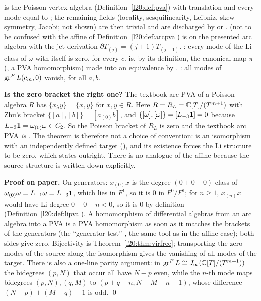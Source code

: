 \begin{dictionary}
 is the Poisson vertex algebra (Definition~\ref{l20:def:pva}) with translation  and every mode equal to
; the remaining fields (locality, sesquilinearity, Leibniz, skew-symmetry, Jacobi; not shown) are then trivial and are
discharged by  or .  (not to be confused with the affine
 of Definition~\ref{l20:def:arcpva}) is  on the presented arc algebra with the jet derivation
$\partial T_{(j)}=(j+1)T_{(j+1)}$. : every mode of the Li class of $\omega$ with itself is zero, for every $c$.
 is, by its definition, the canonical map $\pi$ (, a PVA homomorphism) made into an
equivalence by . : all modes of $\operatorname{gr}^F L(c_m,0)$ vanish, for all
$a,b$.

\textbf{Is the zero bracket the right one?} The textbook arc PVA of a Poisson algebra $R$ has $\{x_\lambda y\}=\{x,y\}$ for
$x,y\in R$. Here $R=R_L={\mathbb{C}}[T]/(T^{m+1})$ with Zhu's bracket $\{[a],[b]\}=[a_{(0)}b]$, and $\{[\omega],[\omega]\}=[L_{-3}\mathbf{1}]=0$
because $L_{-3}\mathbf{1}=\omega_{(0)}\omega\in C_2$. So the Poisson bracket of $R_L$ is zero and the textbook arc PVA \emph{is}
. The theorem is therefore not a choice of convention:  is an isomorphism with an independently
defined target (), and its existence forces the Li structure to be zero, which
 states outright. There is no analogue of the affine  because the source
structure is written down explicitly.
\end{dictionary}

\textbf{Proof on paper.} On generators: $x_{(0)}x$ is the degree-$(0+0-0)$ class of $\omega_{(0)}\omega=L_{-1}\omega=L_{-3}\mathbf{1}$,
which lies in $F^1$, so it is $0$ in $F^0/F^1$; for $n\ge1$, $x_{(n)}x$ would have Li degree $0+0-n<0$, so it is $0$ by definition
(Definition~\ref{l20:def:lipva}). A homomorphism of differential algebras from an arc algebra into a PVA is a PVA homomorphism as
soon as it matches the brackets of the generators (the ``generator test'' , the same tool as in
the affine case); both sides give zero. Bijectivity is Theorem~\ref{l20:thm:virfree}; transporting the zero modes of the source
along the isomorphism gives the vanishing of all modes of the target. There is also a one-line parity argument: in
$\operatorname{gr}^F L\cong J_\infty({\mathbb{C}}[T]/(T^{m+1}))$ the bidegrees $(p,N)$ that occur all have $N-p$ even, while the $n$-th mode maps
bidegrees $(p,N),(q,M)$ to $(p+q-n,N+M-n-1)$, whose difference $(N-p)+(M-q)-1$ is odd. \qed

